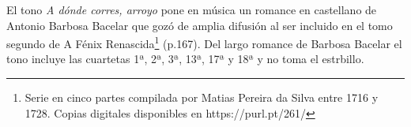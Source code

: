 
El tono \textit{A dónde corres, arroyo} pone en música un romance en castellano de Antonio Barbosa Bacelar que gozó de amplia difusión al ser incluido en el tomo segundo de A Fénix Renascida\footnote{Serie en cinco partes compilada por Matias Pereira da Silva entre 1716 y 1728. Copias digitales disponibles en https://purl.pt/261/} (p.167). Del largo romance de Barbosa Bacelar el tono incluye las cuartetas 1ª, 2ª, 3ª, 13ª, 17ª y 18ª y no toma el estrbillo.


